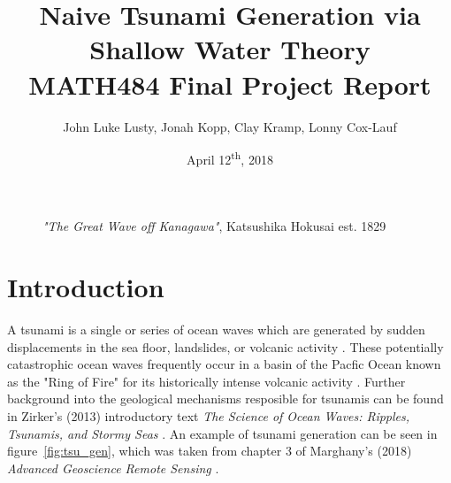 \documentclass[12pt,a4]{article}
\begin{document}
\title{Naive Tsunami Generation via Shallow Water Theory\\
\large  MATH484 Final Project Report}
\author{John Luke Lusty, Jonah Kopp, Clay Kramp, Lonny Cox-Lauf}
\date{April 12\textsuperscript{th}, 2018}

\begin{titlepage}
	\maketitle
    \begin{figure}[h]
        \centering
        \caption*{\textit{"The Great Wave off Kanagawa"}, Katsushika Hokusai est. 1829}
    \end{figure}
\end{titlepage}

	
\tableofcontents
\pagebreak
   
\section{Introduction}
A tsunami is a single or series of ocean waves which are generated by sudden displacements in the sea floor, landslides, or volcanic activity \cite{zirker}. These potentially catastrophic ocean waves frequently occur in a basin of the Pacfic Ocean known as the "Ring of Fire" for its historically intense volcanic activity \cite{zirker}. Further background into the geological mechanisms resposible for tsunamis can be found in Zirker's (2013) introductory text \textit{The Science of Ocean Waves: Ripples, Tsunamis, and Stormy Seas} \cite{zirker}. An example of tsunami generation can be seen in figure~\ref{fig:tsu_gen}, which was taken from chapter 3 of Marghany's (2018) \textit{Advanced Geoscience Remote Sensing} \cite{marghany}. 
\end{document}
